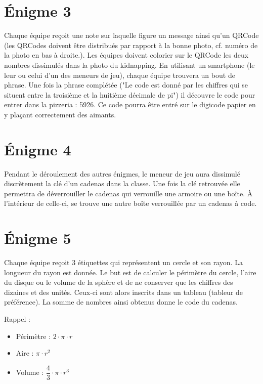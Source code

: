 \documentclass[12pt, parskip=half-]{scrartcl}
\begin{document}
\section*{Énigme 3}
Chaque équipe reçoit une note sur laquelle figure un message ainsi qu'un QRCode (les QRCodes doivent être distribués par rapport à la bonne photo, cf. numéro de la photo en bas à droite.). Les équipes doivent colorier sur le QRCode les deux nombres dissimulés dans la photo du kidnapping. En utilisant un smartphone (le leur ou celui d'un des meneurs de jeu), chaque équipe trouvera un bout de phrase. Une fois la phrase complétée ("Le code est donné par les chiffres qui se situent entre la troisième et la huitième décimale de pi") il découvre le code pour entrer dans la pizzeria : 5926. Ce code pourra être entré sur le digicode papier en y plaçant correctement des aimants.

\section*{Énigme 4}
Pendant le déroulement des autres énigmes, le meneur de jeu aura dissimulé discrètement la clé d'un cadenas dans la classe. Une fois la clé retrouvée elle permettra de déverrouiller le cadenas qui verrouille une armoire ou une boîte. À l'intérieur de celle-ci, se trouve une autre boîte verrouillée par un cadenas à code.

\section*{Énigme 5}
Chaque équipe reçoit 3 étiquettes qui représentent un cercle et son rayon. La longueur du rayon est donnée. Le but est de calculer le périmètre du cercle, l'aire du disque ou le volume de la sphère et de ne conserver que les chiffres des dizaines et des unités. Ceux-ci sont alors inscrits dans un tableau (tableur de préférence). La somme de nombres ainsi obtenus donne le code du cadenas.

Rappel :
\begin{itemize}
    \item Périmètre : \(2 \cdot \pi \cdot r\)
    \item Aire : \(\pi \cdot r^2\)
    \item Volume : \(\dfrac{4}{3} \cdot \pi \cdot r^3\)
\end{itemize}
\end{document}
